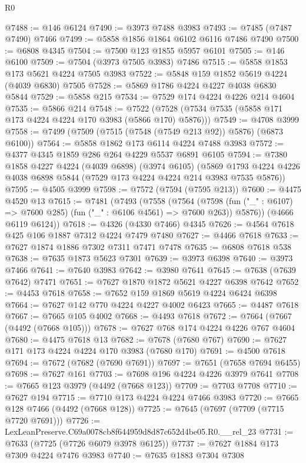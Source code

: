 \begin{lexlean}{R0}
\begin{coremodule}
@7488 := @146 @6124
@7490 := @3973 @7488 @3983
@7493 := @7485 (@7487 @7490) @7466
@7499 := @5858 @1856 @1864 @6102 @6116 @7486 @7490
@7500 := @6808 @4345
@7504 := @7500 @123 @1855 @5957 @6101
@7505 := @146 @6100
@7509 := @7504 (@3973 @7505 @3983) @7486
@7515 := @5858 @1853 @173 @5621 @4224 @7505 @3983
@7522 := @5848 @159 @1852 @5619 @4224 (@4039 @6830) @7505
@7528 := @5869 @1786 @4224 @4227 @4038 @6830 @5844
@7529 := @5858 @215
@7534 := @7529 @174 @4224 @4226 @214 @4604
@7535 := @5866 @214
@7548 := @7522 (@7528 (@7534 @7535 (@5858 @171 @173 @4224 @4224 @170 @3983 (@5866 @170) @5876)))
@7549 := @4708 @3999
@7558 := @7499 (@7509 (@7515 (@7548 (@7549 @213 @92)) @5876) (@6873 @6100))
@7564 := @5858 @1862 @173 @6114 @4224 @7488 @3983
@7572 := @4377 @4345 @1859 @286 @264 @4229 @5537 @6891 @6105
@7594 := @7380
    @1858
    @4227
    @4224
    (@4039 @6898)
    (@3974 @6105)
    (@5869 @1793 @4224 @4226 @4038 @6898 @5844 (@7529 @173 @4224 @4224 @214 @3983 @7535 @5876))
@7595 := @4505 @3999
@7598 := @7572 (@7594 (@7595 @213))
@7600 := @4475 @4520 @13
@7615 := @7481
    (@7493
      (@7558
        (@7564
          (@7598 (fun ("_" : @6107) => @7600 @285) (fun ("_" : @6106 @4561) => @7600 @263))
          @5876))
      (@4666 @6119 @6124))
@7618 := @4326 (@4330 @7466) @4345
@7626 := @4564 @7618 @425 @106 @1887 @7312 @4224 @7479 @7480
@7627 := @4466 @7618
@7633 := @7627 @1874 @1886 @7302 @7311 @7471 @7478
@7635 := @6808 @7618 @538
@7638 := @7635 @1873 @5623 @7301
@7639 := @3973 @6398
@7640 := @3973 @7466
@7641 := @7640 @3983
@7642 := @3980 @7641
@7645 := @7638 (@7639 @7642) @7471
@7651 := @7627 @1870 @1872 @5621 @4227 @6398 @7642
@7652 := @4453 @7618
@7658 := @7652 @159 @1869 @5619 @4224 @6424 @6398
@7664 := @7627 @142 @770 @4224 @4227 @4002 @6423
@7665 := @4487 @7618
@7667 := @7665 @105 @4002
@7668 := @4493 @7618
@7672 := @7664 (@7667 (@4492 (@7668 @105)))
@7678 := @7627 @768 @174 @4224 @4226 @767 @4604
@7680 := @4475 @7618 @13
@7682 := @7678 (@7680 @767)
@7690 := @7627 @171 @173 @4224 @4224 @170 @3983 (@7680 @170)
@7691 := @4500 @7618
@7694 := @7672 (@7682 (@7690 @7691))
@7697 := @7651 (@7658 @7694 @6455)
@7698 := @7627 @161
@7703 := @7698 @196 @4224 @4226 @3979 @7641
@7708 := @7665 @123 @3979 (@4492 (@7668 @123))
@7709 := @7703 @7708
@7710 := @7627 @194
@7715 := @7710 @173 @4224 @4224 @7466 @3983
@7720 := @7665 @128 @7466 (@4492 (@7668 @128))
@7725 := @7645 (@7697 (@7709 (@7715 @7720 @7691)))
@7726 := LexLeanPreserve.C69a0078cb8f644959d8d87c652d4be05.R0.__rel_23
@7731 := @7633 (@7725 (@7726 @6079 @3978 @6125))
@7737 := @7627 @1884 @173 @7309 @4224 @7476 @3983
@7740 := @7635 @1883 @7304 @7308

\end{coremodule}
\end{lexlean}
